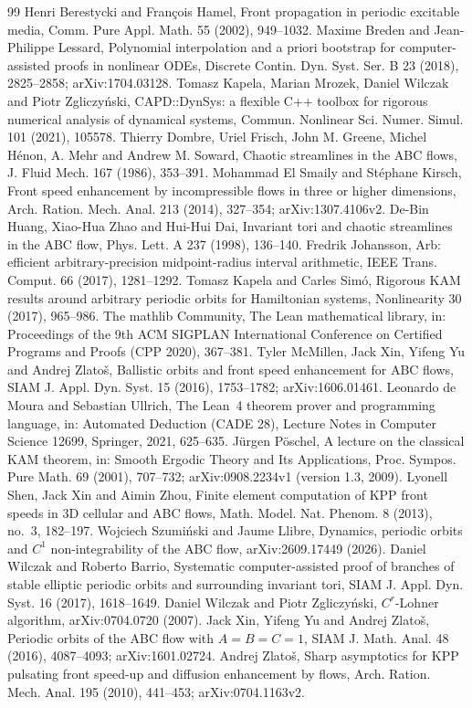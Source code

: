 \documentclass[11pt]{article}
\theoremstyle{definition}
\theoremstyle{remark}
\begin{document}
\begin{thebibliography}{99}
 Henri Berestycki and François Hamel, Front propagation in
periodic excitable media, Comm. Pure Appl. Math. 55 (2002), 949--1032.
 Maxime Breden and Jean-Philippe Lessard, Polynomial interpolation
and a priori bootstrap for computer-assisted proofs in nonlinear ODEs,
Discrete Contin. Dyn. Syst. Ser. B 23 (2018), 2825--2858; arXiv:1704.03128.
 Tomasz Kapela, Marian Mrozek, Daniel Wilczak and Piotr
Zgliczyński, CAPD::DynSys: a flexible C++ toolbox for rigorous numerical
analysis of dynamical systems, Commun. Nonlinear Sci. Numer. Simul. 101
(2021), 105578.
 Thierry Dombre, Uriel Frisch, John M. Greene, Michel Hénon,
A. Mehr and Andrew M. Soward, Chaotic streamlines in the ABC flows, J. Fluid
Mech. 167 (1986), 353--391.
 Mohammad El Smaily and Stéphane Kirsch, Front speed enhancement
by incompressible flows in three or higher dimensions, Arch. Ration. Mech.
Anal. 213 (2014), 327--354; arXiv:1307.4106v2.
 De-Bin Huang, Xiao-Hua Zhao and Hui-Hui Dai, Invariant tori and
chaotic streamlines in the ABC flow, Phys. Lett. A 237 (1998), 136--140.
 Fredrik Johansson, Arb: efficient arbitrary-precision
midpoint-radius interval arithmetic, IEEE Trans. Comput. 66 (2017),
1281--1292.
 Tomasz Kapela and Carles Simó, Rigorous KAM results around
arbitrary periodic orbits for Hamiltonian systems, Nonlinearity 30 (2017),
965--986.
 The mathlib Community, The Lean mathematical library, in:
Proceedings of the 9th ACM SIGPLAN International Conference on Certified
Programs and Proofs (CPP 2020), 367--381.
 Tyler McMillen, Jack Xin, Yifeng Yu and Andrej Zlatoš,
Ballistic orbits and front speed enhancement for ABC flows, SIAM J. Appl.
Dyn. Syst. 15 (2016), 1753--1782; arXiv:1606.01461.
 Leonardo de Moura and Sebastian Ullrich, The Lean~4 theorem
prover and programming language, in: Automated Deduction (CADE 28), Lecture
Notes in Computer Science 12699, Springer, 2021, 625--635.
 Jürgen Pöschel, A lecture on the classical KAM theorem, in:
Smooth Ergodic Theory and Its Applications, Proc. Sympos. Pure Math. 69
(2001), 707--732; arXiv:0908.2234v1 (version 1.3, 2009).
 Lyonell Shen, Jack Xin and Aimin Zhou, Finite element
computation of KPP front speeds in 3D cellular and ABC flows, Math. Model.
Nat. Phenom. 8 (2013), no.~3, 182--197.
 Wojciech Szumiński and Jaume Llibre, Dynamics, periodic orbits
and $C^1$ non-integrability of the ABC flow, arXiv:2609.17449 (2026).
 Daniel Wilczak and Roberto Barrio, Systematic computer-assisted
proof of branches of stable elliptic periodic orbits and surrounding invariant
tori, SIAM J. Appl. Dyn. Syst. 16 (2017), 1618--1649.
 Daniel Wilczak and Piotr Zgliczyński, $C^r$-Lohner algorithm,
arXiv:0704.0720 (2007).
 Jack Xin, Yifeng Yu and Andrej Zlatoš, Periodic orbits of the
ABC flow with $A=B=C=1$, SIAM J. Math. Anal. 48 (2016), 4087--4093;
arXiv:1601.02724.
 Andrej Zlatoš, Sharp asymptotics for KPP pulsating front speed-up
and diffusion enhancement by flows, Arch. Ration. Mech. Anal. 195 (2010),
441--453; arXiv:0704.1163v2.
\end{thebibliography}
\end{document}
